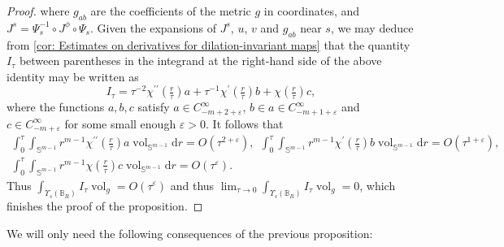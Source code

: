 \documentclass{article}
\numberwithin{equation}{section}        %
\theoremstyle{bfnote}
\theoremstyle{definition}
\theoremstyle{bfremark}
\newcommand{\Ball}{\mathbb{B}}              %
\newcommand{\Sp}{\mathbb{S}}                %
\newcommand{\diff}{\mathrm{d}}                      %
\DeclareMathOperator{\vol}{vol}                 %
\begin{document}
\begin{proof}
    where $g_{ab}$ are the coefficients of the metric $g$ in coordinates, and $J^s = \Psi_s^{-1} \circ J^\phi  \circ \Psi_s$. Given the expansions of $J^s$, $u$, $v$ and $g_{ab}$ near $s$, we may deduce from \cref{cor: Estimates on derivatives for dilation-invariant maps} that the quantity $I_\tau$ between parentheses in the integrand at the right-hand side of the above identity may be written as 
    \begin{equation*}
        I_\tau = \tau^{-2}\chi^{\prime\prime}(\tfrac{r}{\tau}) a + \tau^{-1} \chi^\prime(\tfrac{r}{\tau})b + \chi(\tfrac{r}{\tau})c,
    \end{equation*}
    where the functions $a, b, c$ satisfy $a \in C^\infty_{-m+2+\varepsilon}$, $b \in a \in C^\infty_{-m+1+\varepsilon}$ and $c \in C^\infty_{-m + \varepsilon}$ for some small enough $\varepsilon > 0$. It follows that 
    \begin{multline*}
        \int_0^\tau \int_{\Sp^{m-1}} r^{m-1} \chi^{\prime\prime}(\tfrac{r}{\tau})a \vol_{\Sp^{m-1}} \diff  r = O(\tau^{2+\varepsilon}), ~~ \int_0^\tau \int_{\Sp^{m-1}} r^{m-1} \chi^\prime(\tfrac{r}{\tau}) b \vol_{\Sp^{m-1}} \diff  r= O(\tau^{1+\varepsilon}), \\ \int_0^\tau \int_{\Sp^{m-1}} r^{m-1} \chi(\tfrac{r}{\tau}) c \vol_{\Sp^{m-1}} \diff  r  = O(\tau^\varepsilon) .
    \end{multline*}
    Thus $\int_{\Upsilon_s(\Ball_R)} I_\tau \vol_{g} = O(\tau^\varepsilon)$ and thus $\lim_{\tau \to 0} \int_{\Upsilon_s(\Ball_R)} I_\tau \vol_{g} = 0$, which finishes the proof of the proposition.
\end{proof}

We will only need the following consequences of the previous proposition:
\end{document}
